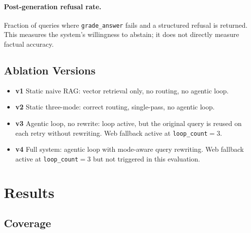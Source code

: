 \documentclass[11pt]{article}
\begin{document}
\paragraph{Post-generation refusal rate.}
Fraction of queries where \texttt{grade\_answer} fails and a structured
refusal is returned. This measures the system's willingness to abstain; it
does not directly measure factual accuracy.

\subsection{Ablation Versions}

\begin{itemize}
  \item \textbf{v1} Static naive RAG: vector retrieval only, no routing,
        no agentic loop.
  \item \textbf{v2} Static three-mode: correct routing, single-pass, no
        agentic loop.
  \item \textbf{v3} Agentic loop, no rewrite: loop active, but the
        original query is reused on each retry without rewriting. Web
        fallback active at \texttt{loop\_count}$=3$.
  \item \textbf{v4} Full system: agentic loop with mode-aware query
        rewriting. Web fallback active at \texttt{loop\_count}$=3$ but
        not triggered in this evaluation.
\end{itemize}

\section{Results}
\label{sec:results}

\subsection{Coverage}

\begin{table}[t]
\centering
\small
{}
\caption{Query coverage (\% answered, $n=80$) per ablation version and
         query type. v2 answered 23 queries (28.8\%); v3 answered 22
         (27.5\%); v4 answered 65 (81.2\%). v4 is the only version with
         strong coverage across all three types.}
\label{tab:coverage}
\end{table}
\end{document}
